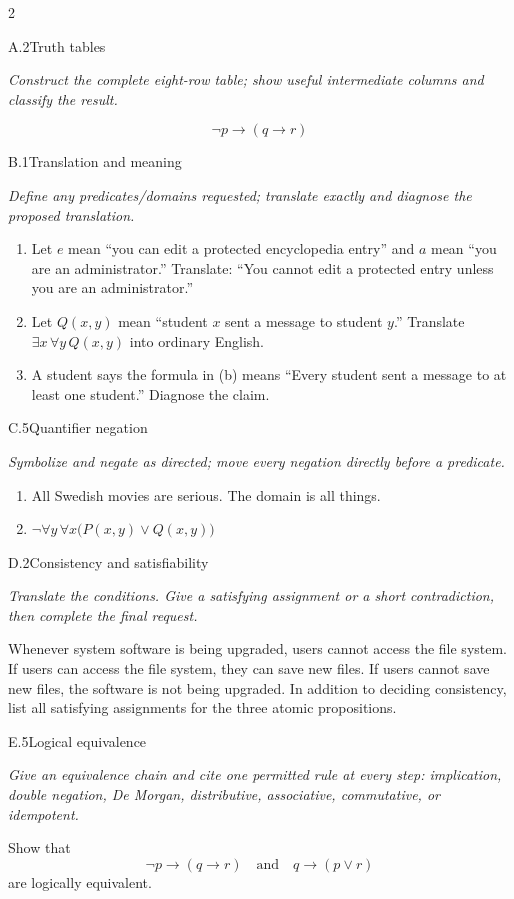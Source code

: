 \documentclass[9pt]{extarticle}
\begin{document}
\CoreWorkArea
\FormBreak
{}
\begin{multicols}{2}
\begin{CoreProblem}{A.2}{Truth tables}
{\scriptsize\textit{Construct the complete eight-row table; show useful intermediate columns and classify the result.}\par}
\[
  \neg p\to(q\to r)
\]
\end{CoreProblem}
\begin{CoreProblem}{B.1}{Translation and meaning}
{\scriptsize\textit{Define any predicates/domains requested; translate exactly and diagnose the proposed translation.}\par}
\begin{enumerate}[label=(\alph*)]
  \item Let $e$ mean ``you can edit a protected encyclopedia entry'' and $a$
        mean ``you are an administrator.'' Translate: ``You cannot edit a
        protected entry unless you are an administrator.''
  \item Let $Q(x,y)$ mean ``student $x$ sent a message to student $y$.''
        Translate $\exists x\,\forall y\,Q(x,y)$ into ordinary English.
  \item A student says the formula in (b) means ``Every student sent a message
        to at least one student.'' Diagnose the claim.
\end{enumerate}
\end{CoreProblem}
\begin{CoreProblem}{C.5}{Quantifier negation}
{\scriptsize\textit{Symbolize and negate as directed; move every negation directly before a predicate.}\par}
\begin{enumerate}[label=(\alph*)]
  \item All Swedish movies are serious. The domain is all things.
  \item $\neg\forall y\,\forall x\bigl(P(x,y)\lor Q(x,y)\bigr)$
\end{enumerate}
\end{CoreProblem}
\columnbreak
\begin{CoreProblem}{D.2}{Consistency and satisfiability}
{\scriptsize\textit{Translate the conditions. Give a satisfying assignment or a short contradiction, then complete the final request.}\par}
Whenever system software is being upgraded, users cannot access the file
system. If users can access the file system, they can save new files. If users
cannot save new files, the software is not being upgraded. In addition to
deciding consistency, list all satisfying assignments for the three atomic
propositions.
\end{CoreProblem}
\begin{CoreProblem}{E.5}{Logical equivalence}
{\scriptsize\textit{Give an equivalence chain and cite one permitted rule at every step: implication, double negation, De Morgan, distributive, associative, commutative, or idempotent.}\par}
Show that
\[
  \neg p\to(q\to r)
  \quad\text{and}\quad
  q\to(p\lor r)
\]
are logically equivalent.
\end{CoreProblem}
\end{multicols}
\end{document}
